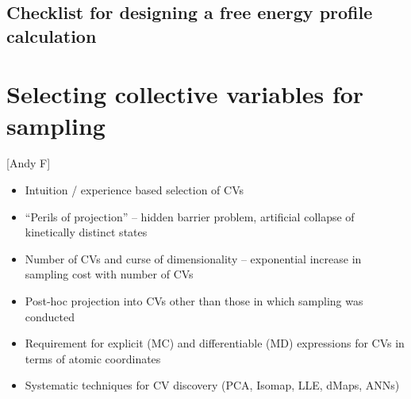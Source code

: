 \documentclass[9pt]{livecoms}
\begin{document}


\subsection{Checklist for designing a free energy profile calculation}

\section{Selecting collective variables for sampling}

[Andy F]

\begin{itemize}
\item Intuition / experience based selection of CVs
\item ``Perils of projection'' -- hidden barrier problem, artificial collapse of kinetically distinct states
\item Number of CVs and curse of dimensionality -- exponential increase in sampling cost with number of CVs
\item Post-hoc projection into CVs other than those in which sampling was conducted \cite{ferguson2017bayeswham}
\item Requirement for explicit (MC) and differentiable (MD) expressions for CVs in terms of atomic coordinates
\item Systematic techniques for CV discovery (PCA, Isomap, LLE, dMaps, ANNs)
\end{itemize}
\end{document}
